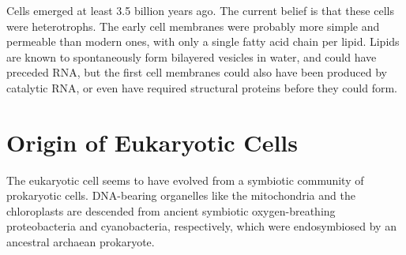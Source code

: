 Cells emerged at least 3.5 billion years ago. The current belief is that these cells were heterotrophs. The early cell membranes were probably more simple and permeable than modern ones, with only a single fatty acid chain per lipid. Lipids are known to spontaneously form bilayered vesicles in water, and could have preceded RNA, but the first cell membranes could also have been produced by catalytic RNA, or even have required structural proteins before they could form.

\hypertarget{origin-of-eukaryotic-cells}{%
\section{Origin of Eukaryotic Cells}\label{origin-of-eukaryotic-cells}}

The eukaryotic cell seems to have evolved from a symbiotic community of prokaryotic cells. DNA-bearing organelles like the mitochondria and the chloroplasts are descended from ancient symbiotic oxygen-breathing proteobacteria and cyanobacteria, respectively, which were endosymbiosed by an ancestral archaean prokaryote.


